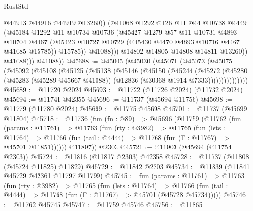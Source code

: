 \begin{lexlean}{RustStd}
\begin{coremodule}
                          @44913
                          @44916
                          @44919
                          @13260))
                      (@41068
                        @1292
                        @126
                        @11
                        @44
                        @10738
                        @4449
                        (@45184
                          @1292
                          @11
                          @10734
                          @10736
                          (@45427
                            @1279
                            @57
                            @11
                            @10731
                            @4893
                            @10704
                            @4467
                            (@45423 @10727 @10729 (@45430 @4470 @4893 @10716 @4467 @41085 @15785))
                            @15785))
                        @41088)))
                  @14802
                  @14805
                  @14808
                  @14811
                  @13260))
              @41088)))
        @41088))
@45688 := @45005
    (@45030
      (@45071
        (@45073
          (@45075
            (@45092
              (@45108
                (@45125
                  (@45138
                    (@45146
                      (@45150
                        (@45244
                          (@45272
                            (@45280
                              (@45283 (@45289 @45667 @41088))
                              (@12836 (@30368 @1914 @7333)))))))))))))))
@45689 := @11720 @2024
@45693 := @11722 (@11726 @2024) (@11732 @2024)
@45694 := @11741 @42355
@45696 := @11737 (@45694 @11756)
@45698 := @11779 (@11780 @2024)
@45699 := @11775 @45698
@45701 := @11737 (@45699 @11804)
@45718 := @11736
    (fun (fn : @89) =>
    @45696
      (@11759
        (@11762
          (fun (params : @11761) =>
          @11763
            (fun (rty : @3982) =>
            @11765
              (fun (lets : @11764) =>
              @11766 (fun (tail : @4444) => @11768 (fun (Γ : @11767) => @45701 @11851))))))
        @11897))
    @2303
@45721 := @11903 (@45694 (@11754 @2303))
@45724 := @11816 (@11817 @2303) @42358
@45728 := @11737 (@11808 (@45724 @11825) @11829)
@45729 := @11842 @2303
@45734 := @11839 (@11841 @45729 @42361 @11797 @11799)
@45745 := fun (params : @11761) =>
  @11763
    (fun (rty : @3982) =>
    @11765
      (fun (lets : @11764) =>
      @11766 (fun (tail : @4444) => @11768 (fun (Γ : @11767) => @45701 (@45728 @45734)))))
@45746 := @11762 @45745
@45747 := @11759 @45746
@45756 := @11865

\end{coremodule}
\end{lexlean}
